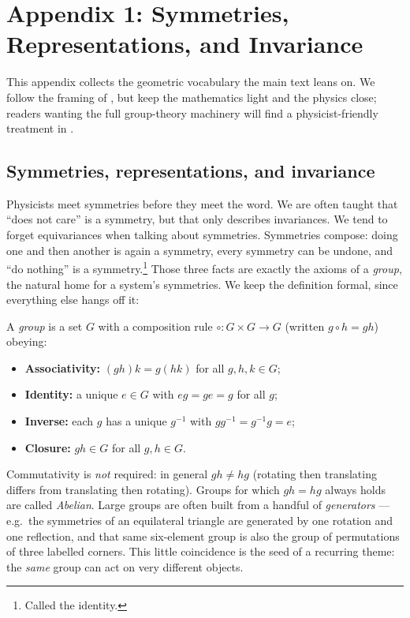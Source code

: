 \section*{Appendix 1: Symmetries, Representations, and Invariance}
\label{app:symmetries}

This appendix collects the geometric vocabulary the main text leans on. We follow the framing of \citet{Bronstein2021_geometricDL_book}, but keep the mathematics light and the physics close; readers wanting the full group-theory machinery will find a physicist-friendly treatment in \citet{Zee2016_grouptheory_nutshell}.

\subsection*{Symmetries, representations, and invariance}
\label{app:sym:basics}

Physicists meet symmetries before they meet the word. We are often taught that ``does not care'' is a symmetry, but that only describes invariances. We tend to forget equivariances when talking about symmetries. Symmetries compose: doing one and then another is again a symmetry, every symmetry can be undone, and ``do nothing'' is a symmetry.\footnote{Called the identity.} Those three facts are exactly the axioms of a \emph{group}, the natural home for a system's symmetries. We keep the definition formal, since everything else hangs off it:

\begin{definition}[Group]
A \emph{group} is a set $G$ with a composition rule
$\circ : G\times G \to G$ (written $g\circ h = gh$) obeying:
\begin{itemize}
  \item \textbf{Associativity:} $(gh)k = g(hk)$ for all $g,h,k\in G$;
  \item \textbf{Identity:} a unique $e\in G$ with $eg = ge = g$ for all $g$;
  \item \textbf{Inverse:} each $g$ has a unique $g^{-1}$ with $gg^{-1}=g^{-1}g=e$;
  \item \textbf{Closure:} $gh\in G$ for all $g,h\in G$.
\end{itemize}
\end{definition}

Commutativity is \emph{not} required: in general $gh \neq hg$ (rotating then translating differs from translating then rotating). Groups for which $gh=hg$ always holds are called \emph{Abelian}. Large groups are often built from a handful of \emph{generators} --- e.g.\ the symmetries of an equilateral triangle are generated by one rotation and one reflection, and that same six-element group is also the group of permutations of three labelled corners. This little coincidence is the seed of a recurring theme: the \emph{same} group can act on very different objects.

